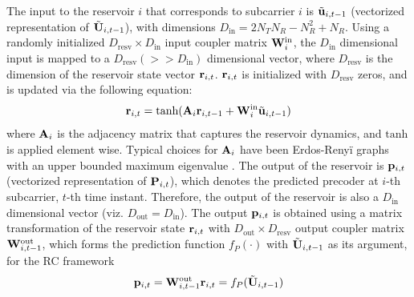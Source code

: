 \documentclass[conference]{IEEEtran}
\begin{document}
{The input to the reservoir $i$ that corresponds to subcarrier $i$ is $\tilde{{\bf u}}_{i,t-1}$ (vectorized representation of $\tilde{{\bf U}}_{i,t-1}$), with dimensions $D_{\text{in}}=2N_TN_R-N_R^2+N_R$.
Using a randomly initialized $D_{\text{resv}}\times D_{\text{in}}$ input coupler matrix ${\bf W}^{\text{in}}_i$, the $D_{\text{in}}$ dimensional input is mapped to a $D_{\text{resv}}(>>D_{\text{in}})$ dimensional vector, where $D_{\text{resv}}$ is the dimension of the reservoir state vector ${\bf r}_{i,t}$. ${\bf r}_{i,t}$ is initialized with $D_{\text{resv}}$ zeros, and is updated via the following equation:
\begin{equation}
\br_{i,t}=\text{tanh}(\bA_i\br_{i,t-1}+\bW^{\text{in}}_i\tilde{\bu}_{i,t-1})
\label{res_upd}
\end{equation}
where ${\bf A}_i$ is the adjacency matrix that captures the reservoir dynamics, and $\text{tanh}$ is applied element wise.
Typical choices for ${\bf A}_i$ have been Erdos-Reny\"i graphs with an upper bounded maximum eigenvalue \cite{mosleh2017brain,pathak2017using}. The output of the reservoir is ${\bf p}_{i,t}$ (vectorized representation of ${\bf P}_{i,t}$), which denotes the predicted precoder at $i$-th subcarrier, $t$-th time instant.
Therefore, the output of the reservoir is also a $D_{\text{in}}$ dimensional vector (viz. $D_{\text{out}}=D_{\text{in}}$).
The output ${\bf p}_{i,t}$ is obtained using a matrix transformation of the reservoir state ${\bf r}_{i,t}$ with $D_{\text{out}}\times D_{\text{resv}}$ output coupler matrix ${\bf W}^{\text{out}}_{i,t-1}$, which forms the prediction function $f_P(\cdot)$ with $\tilde{{\bf U}}_{i,t-1}$ as its argument, for the RC framework
\begin{equation}
\bp_{i,t}=\bW^{\text{out}}_{i,t-1}\br_{i,t}=f_P(\tilde{\bU}_{i,t-1})
\label{pred_op}
\end{equation}

}
\end{document}

